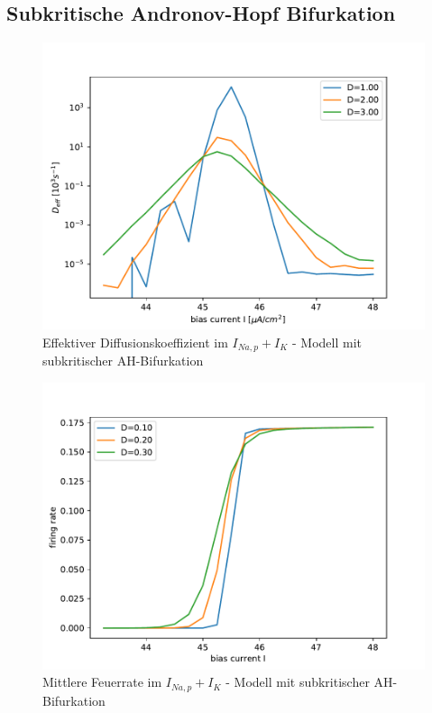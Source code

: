 \documentclass[12pt,a4paper]{article}
\begin{document}
\subsection{Subkritische Andronov-Hopf Bifurkation}
\begin{figure}[H]
	\centering
	\includegraphics[scale=1]{dneurrealanhopf22j3.pdf}\caption{Effektiver Diffusionskoeffizient im $I_{Na,p}+I_K$ - Modell mit subkritischer AH-Bifurkation}
	\label{deffanhopf}
\end{figure}
\begin{figure}[H]
	\centering
	\includegraphics[scale=1]{gneurrealanhopf22j3.pdf}\caption{Mittlere Feuerrate im $I_{Na,p}+I_K$ - Modell mit subkritischer AH-Bifurkation}
	\label{ganhopf}
\end{figure}
\end{document}
